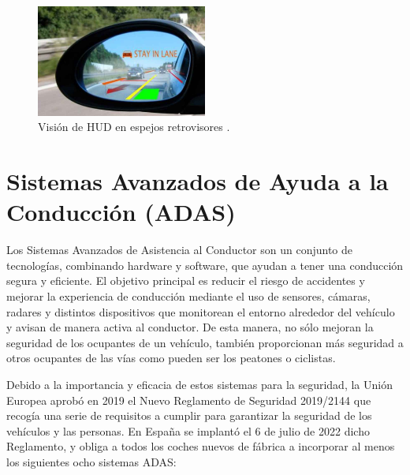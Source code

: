 \documentclass[12pt]{report} %
\begin{document}
\begin{figure}[H]
    \centering
    \includegraphics[width=0.5\textwidth]{retroHUD.png}
    \caption{Visión de HUD en espejos retrovisores \cite{hudPaper}.}
    \label{fig:imagen10}
\end{figure}

\section{Sistemas Avanzados de Ayuda a la Conducción (ADAS)}

Los Sistemas Avanzados de Asistencia al Conductor son un conjunto de tecnologías, combinando hardware y software, que ayudan a tener una conducción segura y eficiente. El objetivo principal es reducir el riesgo de accidentes y mejorar la experiencia de conducción mediante el uso de sensores, cámaras, radares y distintos dispositivos que monitorean el entorno alrededor del vehículo y avisan de manera activa al conductor. De esta manera, no sólo mejoran la seguridad de los ocupantes de un vehículo, también proporcionan más seguridad a otros ocupantes de las vías como pueden ser los peatones o ciclistas.
\cite{adasDGT}

Debido a la importancia y eficacia de estos sistemas para la seguridad, la Unión Europea aprobó en 2019 el Nuevo Reglamento de Seguridad 2019/2144 \cite{adasDGT} que recogía una serie de requisitos a cumplir para garantizar la seguridad de los vehículos y las personas. En España se implantó el 6 de julio de 2022 dicho Reglamento, y obliga a todos los coches nuevos de fábrica a incorporar al menos los siguientes ocho sistemas ADAS: 
\end{document}
